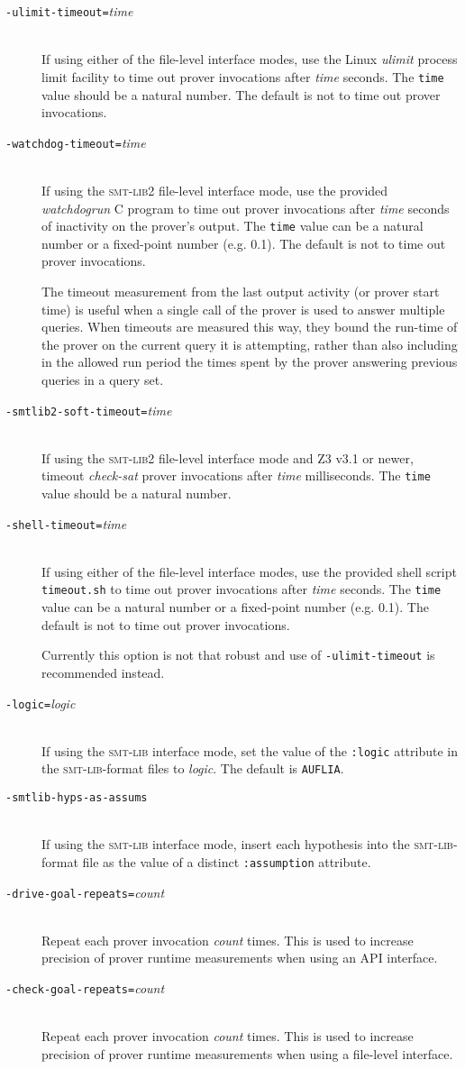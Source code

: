 \documentclass[12pt,fleqn]{article}
\newcommand{\zthree}{\textsc{Z}3}
\newcommand{\smtlib}{\textsc{smt-lib}}
\newcommand{\optionb}[1]{\item[\texttt{-{#1}}]\ \\}
\newcommand{\optionv}[2]{\item[\texttt{-{#1}=}\mdseries\textit{#2}]\ \\}
\begin{document}
\begin{description}
\optionv{ulimit-timeout}{time}
  If using either of the file-level interface modes, 
   use the Linux 
  \emph{ulimit} process limit facility to time out
  prover invocations after \emph{time} seconds.  The \texttt{time} value 
  should be a natural number.
  The default is not to time out prover invocations.

\optionv{watchdog-timeout}{time}
  If using the \smtlib{}2 file-level interface mode, use the provided
  \emph{watchdogrun} C program to time out prover invocations after
  \emph{time} seconds of inactivity on the prover's output.  The
  \texttt{time} value can be a natural number or a fixed-point
  number (e.g. 0.1).  The default is not to time out prover invocations.

  The timeout measurement from the last output activity (or prover
  start time) is useful when a single call of the prover is used to
  answer multiple queries.  When timeouts are measured this way, they
  bound the run-time of the prover on the current query it is
  attempting, rather than also including in the allowed run period the
  times spent by the prover answering previous queries in a query set.

\optionv{smtlib2-soft-timeout}{time}
 If using the \smtlib{}2 file-level interface mode and \zthree{} v3.1 or newer,
 timeout \emph{check-sat} prover invocations after \emph{time} milliseconds.
 The \texttt{time} value should be a natural number.

\optionv{shell-timeout}{time}
  If using either of the file-level interface modes, 
   use the provided shell script 
   \texttt{timeout.sh} to time out prover invocations after \emph{time} 
  seconds.  The \texttt{time} value can
  be a natural number or a fixed-point number (e.g. 0.1).
  The default is not to time out prover invocations.

  Currently this option is not that robust and use of \texttt{-ulimit-timeout}
  is recommended instead.

\optionv{logic}{logic}
  If using the \smtlib{} interface mode, set the value of the 
  \texttt{:logic} attribute in the \smtlib{}-format files to \emph{logic}.
  The default is \texttt{AUFLIA}.

\optionb{smtlib-hyps-as-assums}
  If using the \smtlib{} interface mode, insert each hypothesis into
  the \smtlib{}-format file as the value of a distinct 
  \texttt{:assumption} attribute.

\optionv{drive-goal-repeats}{count}
   Repeat each prover invocation \textit{count} times.
   This is used to increase precision of prover runtime measurements when
   using an API interface.

\optionv{check-goal-repeats}{count}
   Repeat each prover invocation \textit{count} times.
   This is used to increase precision of prover runtime measurements when
   using a file-level interface.  

\end{description}
\end{document}
